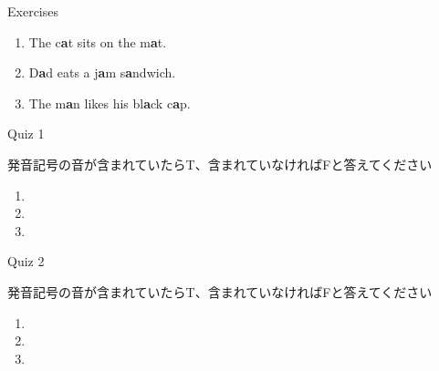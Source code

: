 \documentclass[aspectratio=169,xcolor={dvipsnames,table}]{beamer}
\begin{document}
\begin{frame}[plain]{Exercises}
\LARGE

\begin{enumerate}
 \item The c\textcolor{NavyBlue}{\bfseries a}t sits on the m\textcolor{NavyBlue}{\bfseries a}t.
 \item D\textcolor{NavyBlue}{\bfseries a}d eats a j\textcolor{NavyBlue}{\bfseries a}m s\textcolor{NavyBlue}{\bfseries a}ndwich.
 \item The m\textcolor{NavyBlue}{\bfseries a}n likes his bl\textcolor{NavyBlue}{\bfseries a}ck c\textcolor{NavyBlue}{\bfseries a}p.
\end{enumerate}
\end{frame}
\begin{frame}[plain]{Quiz 1}

 発音記号\textipa{/\ae /}の音が含まれていたらT、含まれていなければFと答えてください

\LARGE
\begin{enumerate}
 \item \mbox{}\hfill{}\hspace{200pt}\mbox{}
 \item \mbox{}\hfill{}\hspace{200pt}\mbox{}
 \item \mbox{}\hfill{}\hspace{200pt}\mbox{}
\end{enumerate}
\end{frame}
\begin{frame}[plain]{Quiz 2}

 発音記号\textipa{/\ae /}の音が含まれていたらT、含まれていなければFと答えてください

\LARGE
\begin{enumerate}
 \item {}\hfill{}\hspace{200pt}\mbox{}
 \item {}\hfill{}\hspace{200pt}\mbox{}
 \item {}\hfill{}\hspace{200pt}\mbox{}
\end{enumerate}
\end{frame}
\end{document}
